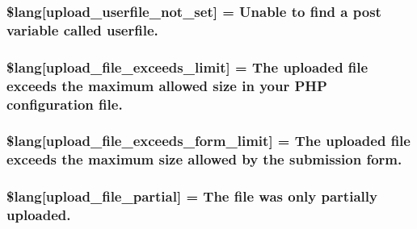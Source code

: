 \subsubsection[{\$lang}]{\setlength{\rightskip}{0pt plus 5cm}\$lang\mbox{[}\textquotesingle{}upload\+\_\+userfile\+\_\+not\+\_\+set\textquotesingle{}\mbox{]} = \textquotesingle{}Unable to find {\bf a} post variable called userfile.\textquotesingle{}}\label{upload__lang_8php_a6d12ff4074b1e4c6f22a4a5107fae5ee}
\hypertarget{upload__lang_8php_a9028f049ebbe292a27e0e2b2e5f7d660}{}
\subsubsection[{\$lang}]{\setlength{\rightskip}{0pt plus 5cm}\$lang\mbox{[}\textquotesingle{}upload\+\_\+file\+\_\+exceeds\+\_\+limit\textquotesingle{}\mbox{]} = \textquotesingle{}The uploaded file exceeds the maximum allowed size in your P\+H\+P configuration file.\textquotesingle{}}\label{upload__lang_8php_a9028f049ebbe292a27e0e2b2e5f7d660}
\hypertarget{upload__lang_8php_af6f65d563af150d50dfc6957079fd529}{}
\subsubsection[{\$lang}]{\setlength{\rightskip}{0pt plus 5cm}\$lang\mbox{[}\textquotesingle{}upload\+\_\+file\+\_\+exceeds\+\_\+form\+\_\+limit\textquotesingle{}\mbox{]} = \textquotesingle{}The uploaded file exceeds the maximum size allowed by the submission form.\textquotesingle{}}\label{upload__lang_8php_af6f65d563af150d50dfc6957079fd529}
\hypertarget{upload__lang_8php_a79751b02ce35007a90bd9052f83deed9}{}
\subsubsection[{\$lang}]{\setlength{\rightskip}{0pt plus 5cm}\$lang\mbox{[}\textquotesingle{}upload\+\_\+file\+\_\+partial\textquotesingle{}\mbox{]} = \textquotesingle{}The file was only partially uploaded.\textquotesingle{}}\label{upload__lang_8php_a79751b02ce35007a90bd9052f83deed9}
\hypertarget{upload__lang_8php_ac7144f4992346816875bac28488ef715}{}
